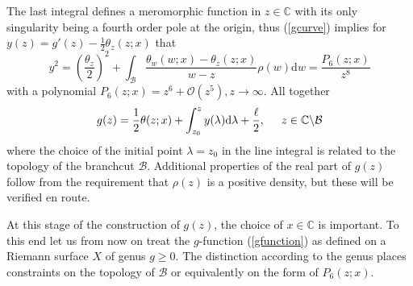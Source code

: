 \documentclass[10pt,oneside,reqno]{amsart}
\numberwithin{equation}{section}
\renewcommand{\d}{{\mathrm d}}
\def\eqref#1{(\ref{#1})}
\begin{document}
The last integral defines a meromorphic function in $z\in\mathbb{C}$ with its only singularity being a fourth order pole at the origin, thus
\eqref{gcurve} implies for $y(z) = g'(z)-\frac{1}{2}\theta_{z}(z;x)$ that
\begin{equation}	
\label{yfun}
  y^2 = \left(\frac{\theta_{z}}{2}\right)^2 + \int_{\mathcal{B}}\frac{\theta_{w}(w;x)-\theta_{z}(z;x)}{w-z}\rho(w)\d w = \frac{P_6(z;x)}{z^8}
\end{equation}
with a polynomial $P_6(z;x) = z^6+\mathcal O\left(z^5\right),z\rightarrow\infty$. All together
\begin{equation}\label{gfunction}
  g(z) = \frac{1}{2}\theta(z;x)+\int_{z_0}^zy(\lambda)\d\lambda+\frac{\ell}{2},\hspace{0.5cm}z\in\mathbb{C}\backslash\mathcal{B}
\end{equation}
where the choice of the initial point $\lambda=z_0$ in the line integral is related to the topology of the branchcut $\mathcal{B}$. 
Additional properties of the real part of $g(z)$ follow from the requirement that $\rho(z)$ is a positive density, but these will be verified en route.

At this stage of the construction of
$g(z)$, the choice of $x\in\mathbb{C}$ is important. To this end let us from now on treat the $g$-function \eqref{gfunction} as defined on a Riemann surface $X$ of genus
$g\geq 0$. The distinction according to the genus places constraints on the topology of $\mathcal{B}$ or equivalently on the form of $P_6(z;x)$.
\end{document}
